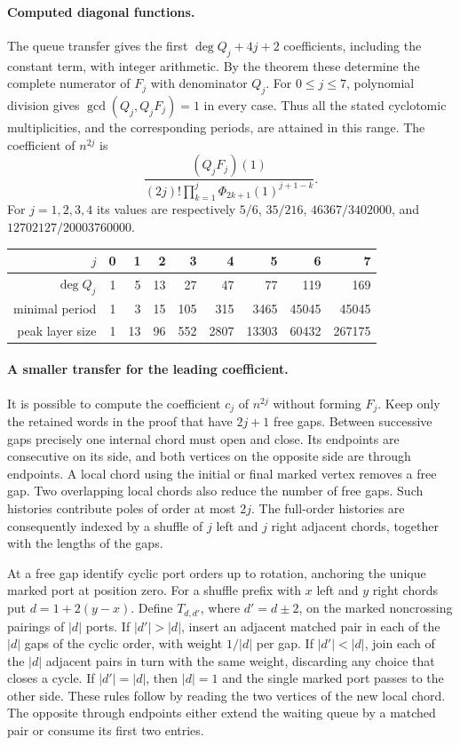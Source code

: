 \paragraph{Computed diagonal functions.}
The queue transfer gives the first \(\deg Q_j+4j+2\) coefficients,
including the constant term, with integer arithmetic. By the theorem
these determine the complete numerator of \(F_j\) with denominator
\(Q_j\). For \(0\le j\le7\), polynomial division gives
\(\gcd(Q_j,Q_jF_j)=1\) in every case. Thus all the stated cyclotomic
multiplicities, and the corresponding periods, are attained in this
range. The coefficient of \(n^{2j}\) is
\[
 \frac{(Q_jF_j)(1)}
 {(2j)!\prod_{k=1}^j\Phi_{2k+1}(1)^{j+1-k}}.
\]
For \(j=1,2,3,4\) its values are respectively \(5/6\), \(35/216\),
\(46367/3402000\), and \(12702127/20003760000\).
\begin{center}
\small\setlength{\tabcolsep}{3pt}
\begin{tabular}{r|rrrrrrrr}
\(j\) & 0&1&2&3&4&5&6&7\\
\hline
\(\deg Q_j\) &1&5&13&27&47&77&119&169\\
minimal period &1&3&15&105&315&3465&45045&45045\\
peak layer size &1&13&96&552&2807&13303&60432&267175
\end{tabular}
\end{center}

\paragraph{A smaller transfer for the leading coefficient.}
It is possible to compute the coefficient \(c_j\) of \(n^{2j}\) without
forming \(F_j\). Keep only the retained words in the proof that have
\(2j+1\) free gaps. Between successive gaps precisely one internal
chord must open and close. Its endpoints are consecutive on its side,
and both vertices on the opposite side are through endpoints. A local
chord using the initial or final marked vertex removes a free gap.
Two overlapping local chords also reduce the number of free gaps. Such
histories contribute poles of order at most \(2j\). The full-order
histories are consequently indexed by a shuffle of \(j\) left and
\(j\) right adjacent chords, together with the lengths of the gaps.

At a free gap identify cyclic port orders up to rotation, anchoring the
unique marked port at position zero. For a shuffle prefix with \(x\)
left and \(y\) right chords put \(d=1+2(y-x)\). Define
\(T_{d,d'}\), where \(d'=d\pm2\), on the marked noncrossing pairings of
\(|d|\) ports. If \(|d'|>|d|\), insert an adjacent matched pair in
each of the \(|d|\) gaps of the cyclic order, with weight \(1/|d|\)
per gap. If \(|d'|<|d|\), join each of the \(|d|\) adjacent pairs in
turn with the same weight, discarding any choice that closes a cycle.
If \(|d'|=|d|\), then \(|d|=1\) and the single marked port passes to
the other side. These rules follow by reading the two vertices of the
new local chord. The opposite through endpoints either extend the
waiting queue by a matched pair or consume its first two entries.

